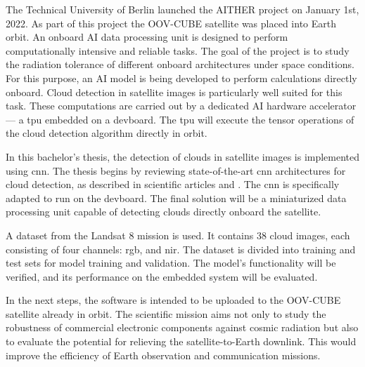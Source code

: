 {

The Technical University of Berlin launched the AITHER project on January 1st, 2022.
As part of this project the OOV-CUBE satellite was placed into Earth orbit.
An onboard AI data processing unit is designed to perform computationally intensive and reliable tasks.
The goal of the project is to study the radiation tolerance of different onboard architectures under space conditions.
For this purpose, an AI model is being developed to perform calculations directly onboard.
Cloud detection in satellite images is particularly well suited for this task.
These computations are carried out by a dedicated AI hardware accelerator --- a \gls{tpu} embedded on a \gls{devboard}.
The \gls{tpu} will execute the tensor operations of the cloud detection algorithm directly in orbit.

In this bachelor's thesis, the detection of clouds in satellite images is implemented using \gls{cnn}.
The thesis begins by reviewing state-of-the-art \gls{cnn} architectures for cloud detection,
as described in scientific articles \cite{CloudNet2019} and \cite{CloudDet2018}.
The \gls{cnn} is specifically adapted to run on the \gls{devboard}.
The final solution will be a miniaturized data processing unit capable of detecting clouds directly onboard the satellite.

A dataset from the Landsat 8 mission is used.
It contains 38 cloud images, each consisting of four channels: \gls{rgb}, and \gls{nir}.
The dataset is divided into training and test sets for model training and validation.
The model's functionality will be verified, and its performance on the embedded system will be evaluated.

In the next steps, the software is intended to be uploaded to the OOV-CUBE satellite already in orbit.
The scientific mission aims not only to study the robustness of commercial electronic components against cosmic radiation but also
to evaluate the potential for relieving the satellite-to-Earth downlink.
This would improve the efficiency of Earth observation and communication missions.

}